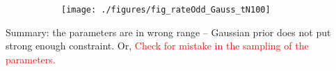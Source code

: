 \documentclass[12pt]{article}
\begin{document}
\begin{figure}[h!]
   \caption{Update rate}\label{fig:traj} \vspace{-2mm}
    \centering
    \hspace{-20mm}
    \begin{subfigure}[b]{0.45\textwidth}       %
        \texttt{[image: ./figures/fig\_rateOdd\_Gauss\_tN100]} %
        \label{fig:gull}
    \end{subfigure}
\end{figure}

Summary: the parameters are in wrong range -- Gaussian prior does not put strong enough constraint. Or, \textcolor{red}{Check for mistake in the sampling of the parameters. }


\newpage
\end{document}
